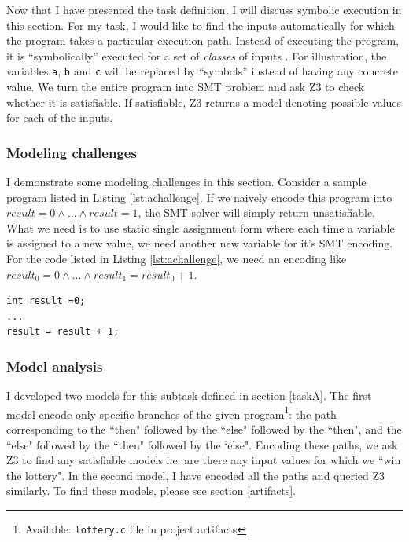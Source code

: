 \documentclass{sig-alternate-05-2015}
\begin{document}
Now that I have presented the task definition, I will discuss symbolic execution in this 
section. For my task, I would like to find the inputs automatically for which the 
program takes a particular execution path. Instead of executing the program, it is 
``symbolically'' executed for a set of \textit{classes} of inputs \cite{King:SE}. 
For illustration, the variables \texttt{a}, \texttt{b} and \texttt{c} will be replaced by 
``symbols'' instead of having any concrete value. We turn the entire program into SMT problem 
and ask Z3 to check whether it is satisfiable. If satisfiable, Z3 returns a model denoting 
possible values for each of the inputs. 

\subsubsection{Modeling challenges} \label{modeling_challenges}

I demonstrate some modeling challenges in this section. Consider a sample program 
listed in Listing \ref{lst:achallenge}. If we naively encode this program into 
$ result=0 \wedge ... \wedge result=1 $, the SMT solver will simply return unsatisfiable. 
What we need is to use static single assignment form \cite{Alpern:SSA} where each time a 
variable is assigned to a new value, we need another new variable for it's SMT encoding. 
For the code listed in Listing \ref{lst:achallenge}, we need an encoding like 
$ result_0 = 0 \wedge ... \wedge result_1 = result_0 + 1 $.

\begin{lstlisting}[caption={Sample program showing modeling challenges for Task A}, label={lst:achallenge}]
int result =0;
...
result = result + 1;
\end{lstlisting}

\subsubsection{Model analysis}

I developed two models for this subtask defined in section \ref{taskA}. The first model encode only 
specific branches of the given program\footnote{Available: \texttt{lottery.c} file in project 
artifacts}: the path corresponding to the ``then" followed by the ``else" 
followed by the ``then", and the ``else" followed by the ``then" followed by the `else". Encoding 
these paths, we ask Z3 to find any satisfiable models i.e. are there any input values for which 
we ``win the lottery". In the second model, I have encoded all the paths and queried Z3 similarly. 
To find these models, please see section \ref{artifacts}.
\end{document}

